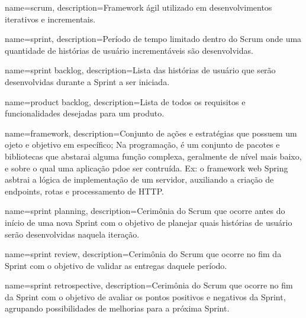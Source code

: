  {
    name=scrum,
    description={Framework ágil utilizado em desenvolvimentos iterativos
    e incrementais.}
}

 {
    name=sprint,
    description={Período de tempo limitado dentro do Scrum onde uma quantidade de histórias de usuário incrementáveis são desenvolvidas.}
}

 {
    name={sprint backlog},
    description={Lista das histórias de usuário que serão desenvolvidas durante a Sprint a ser iniciada.}
}

 {
    name={product backlog},
    description={Lista de todos os requisitos e funcionalidades desejadas para um produto.}
}

 {
    name=framework,
    description={Conjunto de ações e estratégias que possuem um ojeto e objetivo em específico;
    Na programação, é um conjunto de pacotes e bibliotecas que abstarai
    alguma função complexa, geralmente de nível mais baixo, e sobre o
    qual uma aplicação pdoe ser contruída. Ex: o framework web Spring
    asbtrai a lógica de implementação de um servidor, auxiliando a
    criação de endpoints, rotas e processamento de HTTP.}
}




 {
    name={sprint planning},
    description={Cerimônia do Scrum que ocorre antes do início
    de uma nova Sprint com o objetivo de planejar quais histórias
    de usuário serão desenvolvidas naquela iteração.}
}

 {
    name={sprint review},
    description={Cerimônia do Scrum que ocorre no fim da Sprint
    com o objetivo de validar as entregas daquele período.}
}

 {
    name={sprint retrospective},
    description={Cerimônia do Scrum que ocorre no fim da Sprint com
    o objetivo de avaliar os pontos positivos e negativos
    da Sprint, agrupando possibilidades de melhorias
    para a próxima Sprint.}
}
